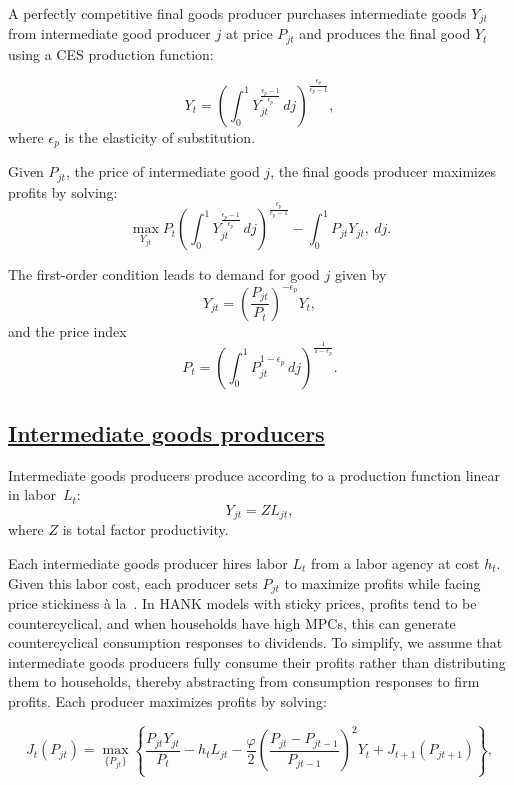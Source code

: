 \documentclass{econsocart}
\begin{document}
A perfectly competitive final goods producer purchases intermediate goods \( Y_{jt} \) from intermediate good producer $j$ at price \( P_{jt} \) and produces the final good \( Y_t \) using a CES production function:

\[
  Y_{t} = {\left(\int_{0}^{1} Y_{jt}^{\frac{\epsilon_{p}-1}{\epsilon_{p}}}\, dj\right)}^{\frac{\epsilon_{p}}{\epsilon_{p}-1}},
\]
where $\epsilon_{p}$ is the elasticity of substitution.

Given $P_{jt}$, the price of intermediate good $j$, the final goods producer maximizes profits by solving:
\[
  \max_{Y_{jt}} P_{t} {\left(\int_{0}^{1} Y_{jt}^{\frac{\epsilon_{p}-1}{\epsilon_{p}}}\, dj\right)}^{\frac{\epsilon_{p}}{\epsilon_{p}-1}} - \int_{0}^{1} P_{jt} Y_{jt} ,\ dj.
\]

The first-order condition leads to demand for good $j$ given by
\[
  Y_{jt} = {\left(\frac {P_{jt}}{P_{t}}\right)}^{- \epsilon_{p}} Y_{t},
\]
and the price index
\[
  P_{t} = {\left(\int_{0}^{1} P_{jt}^{1-\epsilon_{p}}\,dj \right )}^{\frac{1}{1-\epsilon_{p}}}.
\]

\subsection{\href{https://econ-ark.github.io/HAFiscal/\#sec:hank-intermediate-goods-producers}{Intermediate goods producers}}\whenintegrated{\label{sec:hank-intermediate-goods-producers}}

Intermediate goods producers produce according to a production function linear in labor~$L_{t}$:
\[
  Y_{jt} =  Z L_{jt},
\]
where $Z$ is total factor productivity.

Each intermediate goods producer hires labor \( L_t \) from a labor agency at cost \( h_t \). Given this labor cost, each producer sets \( P_{jt} \) to maximize profits while facing price stickiness à la~\cite{Rotemberg1982}. In HANK models with sticky prices, profits tend to be countercyclical, and when households have high MPCs, this can generate countercyclical consumption responses to dividends. To simplify, we assume that intermediate goods producers fully consume their profits rather than distributing them to households, thereby abstracting from consumption responses to firm profits. Each producer maximizes profits by solving:

\[
  J_{t}\left(P_{jt}\right) = \max_{\{P_{jt}\}} \left\{\frac{P_{jt}Y_{jt}}{P_{t}} - h_{t} L_{jt} -  \frac{\varphi}{2}{\left( \frac{P_{jt} - P_{jt-1}}{P_{jt-1}} \right)}^{2} Y_{t}  + J_{t+1}\left(P_{jt+1}\right) \right\},
\]
\end{document}
